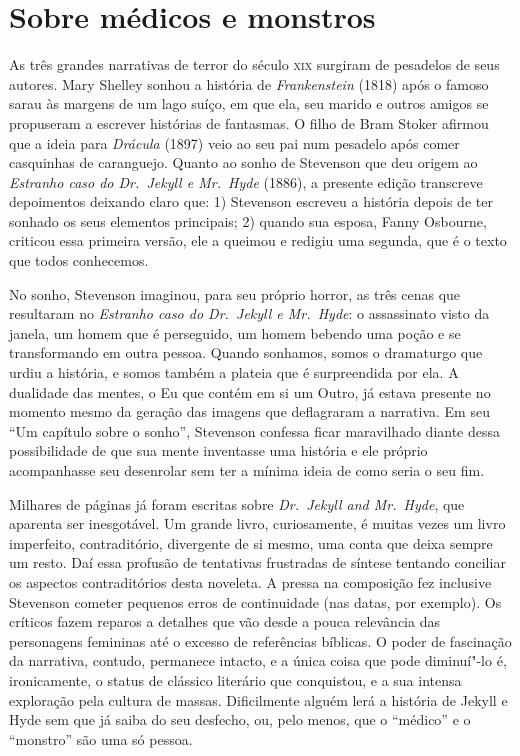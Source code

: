 
\section{Sobre médicos e monstros}

As três grandes narrativas de terror do século \textsc{xix} surgiram de
pesadelos de seus autores.  Mary Shelley sonhou a história de
\textit{Frankenstein} (1818) após o famoso sarau às margens de um lago
suíço, em que ela, seu marido e outros amigos se propuseram a escrever
histórias de fantasmas.  O filho de Bram Stoker afirmou que a ideia
para \textit{Drácula} (1897) veio ao seu pai num pesadelo após comer
casquinhas de caranguejo.  Quanto ao sonho de Stevenson que deu origem
ao \textit{Estranho caso do Dr.~Jekyll e Mr.~Hyde} (1886), a presente
edição transcreve depoimentos deixando claro que: 1) Stevenson escreveu
a história depois de ter sonhado os seus elementos principais; 2)
quando sua esposa, Fanny Osbourne, criticou essa primeira versão, ele a       
queimou e redigiu uma segunda, que é o texto que todos conhecemos.

No sonho, Stevenson imaginou, para seu próprio horror, as três cenas que
resultaram no \textit{Estranho caso do Dr.~Jekyll e Mr.~Hyde}: o
assassinato visto da janela, um homem que é perseguido, um homem
bebendo uma poção e se transformando em outra pessoa. Quando sonhamos,
somos o dramaturgo que urdiu a história, e somos também a plateia que é
surpreendida por ela.  A dualidade das mentes, o Eu que contém em si um
Outro, já estava presente no momento mesmo da geração das imagens que
deflagraram a narrativa.  Em seu “Um capítulo sobre o sonho”, Stevenson
confessa ficar maravilhado diante dessa possibilidade de que sua mente
inventasse uma história e ele próprio acompanhasse seu desenrolar sem
ter a mínima ideia de como seria o seu fim.


Milhares de páginas já foram escritas sobre \textit{Dr.~Jekyll and Mr.~Hyde}, 
que aparenta ser inesgotável. Um grande livro, curiosamente, é muitas 
vezes um livro imperfeito, contraditório, divergente de si mesmo, uma 
conta que deixa sempre um resto.  Daí essa profusão de tentativas frustradas 
de síntese tentando conciliar os aspectos contraditórios desta noveleta.  
A pressa na composição fez inclusive Stevenson cometer pequenos erros de 
continuidade (nas datas, por exemplo). Os críticos fazem reparos a detalhes 
que vão desde a pouca relevância das personagens femininas até o excesso de 
referências bíblicas.  O poder de fascinação da narrativa, contudo, permanece 
intacto, e a única coisa que pode diminuí"-lo é, ironicamente, o status de clássico 
literário que conquistou, e a sua intensa exploração pela cultura de massas. 
Dificilmente alguém lerá a história de Jekyll e Hyde sem que já saiba do seu desfecho, 
ou, pelo menos, que o “médico” e o “monstro” são uma só pessoa.

